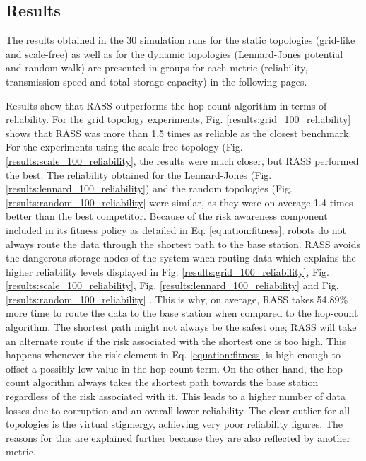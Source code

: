 \subsection{Results}

The results obtained in the 30 simulation runs for the static topologies (grid-like and scale-free) as well as for the dynamic topologies (Lennard-Jones potential and random walk) are presented in groups for each metric (reliability, transmission speed and total storage capacity) in the following pages.

Results show that \ac{RASS} outperforms the hop-count algorithm in terms of reliability. For the grid topology experiments, Fig. \ref{results:grid_100_reliability} shows that \ac{RASS} was more than 1.5 times as reliable as the closest benchmark. For the experiments using the scale-free topology (Fig. \ref{results:scale_100_reliability}, the results were much closer, but \ac{RASS} performed the best. The reliability obtained for the Lennard-Jones (Fig. \ref{results:lennard_100_reliability}) and the random topologies (Fig. \ref{results:random_100_reliability} were similar, as they were on average 1.4 times better than the best competitor. Because of the risk awareness component included in its fitness policy as detailed in Eq. \ref{equation:fitness}, robots do not always route the data through the shortest path to the base station. \ac{RASS} avoids the dangerous storage nodes of the system when routing data which explains the higher reliability levels displayed in Fig. \ref{results:grid_100_reliability}, Fig. \ref{results:scale_100_reliability}, Fig. \ref{results:lennard_100_reliability} and Fig. \ref{results:random_100_reliability} . This is why, on average, \ac{RASS} takes 54.89\% more time to route the data to the base station when compared to the hop-count algorithm. The shortest path might not always be the safest one; \ac{RASS} will take an alternate route if the risk associated with the shortest one is too high. This happens whenever the risk element in Eq. \ref{equation:fitness} is high enough to offset a possibly low value in the hop count term. On the other hand, the hop-count algorithm always takes the shortest path towards the base station regardless of the risk associated with it. This leads to a higher number of data losses due to corruption and an overall lower reliability. The clear outlier for all topologies is the virtual stigmergy, achieving very poor reliability figures. The reasons for this are explained further because they are also reflected by another metric.

